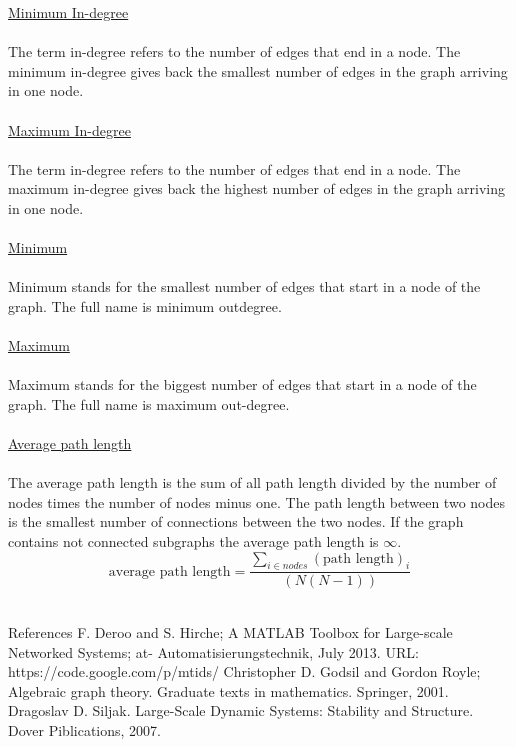 \documentclass[12pt]{report}
\begin{document}
\underline{Minimum In-degree}\\
\\
The term in-degree refers to the number of edges that end in a node. The minimum in-degree gives back the smallest number of edges in the graph arriving in one node.\\
\\
\underline{Maximum In-degree}\\
\\
The term in-degree refers to the number of edges that end in a node. The maximum in-degree gives back the highest number of edges in the graph arriving in one node.\\
\\
\underline{Minimum}\\
\\
Minimum stands for the smallest number of edges that start in a node of the graph. The full name is minimum outdegree.\\
\\
\underline{Maximum}\\
\\
Maximum stands for the biggest number of edges that start in a node of the graph. The full name is maximum out-degree.\\
\\
\underline{Average path length}\\
\\
The average path length is the sum of all path length divided by the number of nodes times the number of nodes minus one. The path length between two nodes is the smallest number of connections between the two nodes. If the graph contains not connected subgraphs the average path length is $ \infty $.
\begin{equation}
\mbox{average path length} = \frac{\sum_{i\in nodes}(\mbox{path length})_i}{(N(N-1))}
\label{EQ:gleichung11}
\end{equation}	
\\
\newpage
\begin{center}
\end{center}
{\Large References}
\newline
\newline
[1] F. Deroo and S. Hirche; A MATLAB Toolbox for Large-scale Networked Systems; at- Automatisierungstechnik, July 2013.
\newline
[2] URL: https://code.google.com/p/mtids/
\newline
[3] Christopher D. Godsil and Gordon Royle; Algebraic graph theory. Graduate texts in mathematics. Springer, 2001.
\newline
[4] Dragoslav D. Siljak. Large-Scale Dynamic Systems: Stability and Structure. Dover Piblications, 2007.
\end{document}
